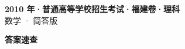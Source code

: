 \documentclass[zihao=-4, a4paper]{ctexart}
\begin{document}
\begin{center}
  {\Large\bfseries 2010 年·普通高等学校招生考试·福建卷·理科}\\[4pt]
  {\large 数学 · 简答版}
\end{center}
\medskip
{}

\clearpage
{}
\begin{center}{\Large\bfseries 答案速查}\end{center}
\medskip

\end{document}
